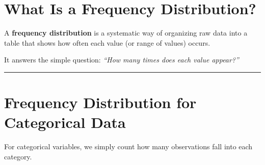 \documentclass[
  12pt,
  letterpaper,
]{book}
\begin{document}
\section{What Is a Frequency
Distribution?}\label{what-is-a-frequency-distribution}

A \textbf{frequency distribution} is a systematic way of organizing raw
data into a table that shows how often each value (or range of values)
occurs.

It answers the simple question: \emph{``How many times does each value
appear?''}

\begin{center}\rule{0.5\linewidth}{0.5pt}\end{center}

\section{Frequency Distribution for Categorical
Data}\label{frequency-distribution-for-categorical-data}

For categorical variables, we simply count how many observations fall
into each category.
\end{document}
